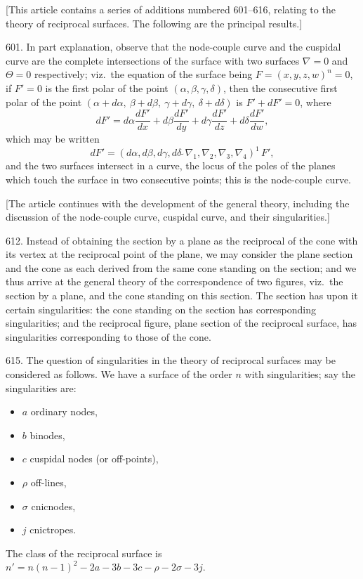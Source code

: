 \documentclass[11pt,a4paper]{book}
\begin{document}
[This article contains a series of additions numbered 601--616, relating to the theory of reciprocal surfaces. The following are the principal results.]

601. In part explanation, observe that the node-couple curve and the cuspidal curve are the complete intersections of the surface with two surfaces $\nabla = 0$ and $\Theta = 0$ respectively; viz.~the equation of the surface being $F = (x, y, z, w)^n = 0$, if $F' = 0$ is the first polar of the point $(\alpha, \beta, \gamma, \delta)$, then the consecutive first polar of the point $(\alpha + d\alpha,\ \beta + d\beta,\ \gamma + d\gamma,\ \delta + d\delta)$ is $F' + dF' = 0$, where
\[
dF' = d\alpha \frac{dF'}{dx} + d\beta \frac{dF'}{dy} + d\gamma \frac{dF'}{dz} + d\delta \frac{dF'}{dw},
\]
which may be written
\[
dF' = (d\alpha, d\beta, d\gamma, d\delta\,\!\!\!{\widetilde{\ }}\nabla_1, \nabla_2, \nabla_3, \nabla_4)^1\, F',
\]
and the two surfaces intersect in a curve, the locus of the poles of the planes which touch the surface in two consecutive points; this is the node-couple curve.

[The article continues with the development of the general theory, including the discussion of the node-couple curve, cuspidal curve, and their singularities.]

612. Instead of obtaining the section by a plane as the reciprocal of the cone with its vertex at the reciprocal point of the plane, we may consider the plane section and the cone as each derived from the same cone standing on the section; and we thus arrive at the general theory of the correspondence of two figures, viz.~the section by a plane, and the cone standing on this section. The section has upon it certain singularities: the cone standing on the section has corresponding singularities; and the reciprocal figure, plane section of the reciprocal surface, has singularities corresponding to those of the cone.

615. The question of singularities in the theory of reciprocal surfaces may be considered as follows. We have a surface of the order $n$ with singularities; say the singularities are:
\begin{itemize}[noitemsep]
\item $a$ ordinary nodes,
\item $b$ binodes,
\item $c$ cuspidal nodes (or off-points),
\item $\rho$ off-lines,
\item $\sigma$ cnicnodes,
\item $j$ cnictropes.
\end{itemize}
The class of the reciprocal surface is $n' = n(n-1)^2 - 2a - 3b - 3c - \rho - 2\sigma - 3j$.
\end{document}
